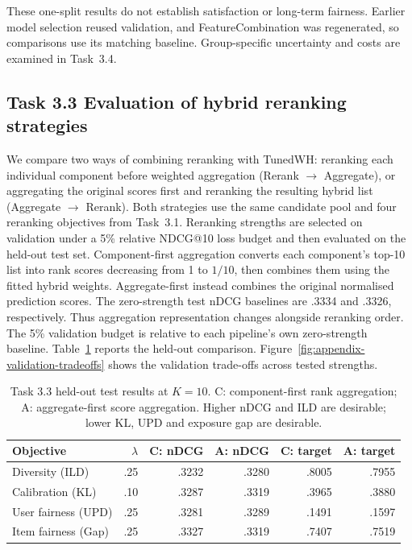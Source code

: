 \documentclass[12pt,a4paper]{article}   %
\begin{document}
These one-split results do not establish satisfaction or
long-term fairness. Earlier model selection reused validation,
and FeatureCombination was regenerated, so comparisons use
its matching baseline. Group-specific uncertainty and costs
are examined in Task~3.4.


\clearpage
\subsection{Task 3.3 Evaluation of hybrid reranking strategies}

We compare two ways of combining reranking with TunedWH:
reranking each individual component before weighted aggregation
(Rerank $\rightarrow$ Aggregate), or aggregating the original
scores first and reranking the resulting hybrid list
(Aggregate $\rightarrow$ Rerank). Both strategies use the same
candidate pool and four reranking objectives from Task~3.1.
Reranking strengths are selected on validation under a 5\%
relative NDCG@10 loss budget and then evaluated on the held-out
test set. Component-first aggregation converts each component's
top-10 list into rank scores decreasing from 1 to $1/10$,
then combines them using the fitted hybrid weights.
Aggregate-first instead combines the original normalised
prediction scores. The zero-strength test nDCG baselines
are .3334 and .3326, respectively. Thus aggregation
representation changes alongside reranking order.
The 5\% validation budget is relative to each pipeline's
own zero-strength baseline. Table~\ref{tab:task33-test}
reports the held-out comparison.
Figure~\ref{fig:appendix-validation-tradeoffs}
shows the validation trade-offs across tested strengths.
\begin{table}[H]
\centering
\begingroup
\setlength{\tabcolsep}{4pt}
\begin{tabular}{lrrrrr}
\toprule
Objective & $\lambda$ & C: nDCG & A: nDCG & C: target & A: target \\
\midrule
Diversity (ILD) & .25 & .3232 & .3280 & .8005 & .7955 \\
Calibration (KL) & .10 & .3287 & .3319 & .3965 & .3880 \\
User fairness (UPD) & .25 & .3281 & .3289 & .1491 & .1597 \\
Item fairness (Gap) & .25 & .3327 & .3319 & .7407 & .7519 \\
\bottomrule
\end{tabular}
\endgroup
\caption{Task 3.3 held-out test results at $K=10$.
C: component-first rank aggregation;
A: aggregate-first score aggregation.
Higher nDCG and ILD are desirable; lower KL, UPD and
exposure gap are desirable.}
\label{tab:task33-test}
\end{table}
\end{document}

